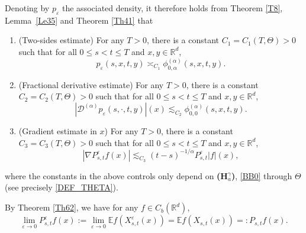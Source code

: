 \documentclass[11pt]{article}
\numberwithin{equation}{section}\providecommand{\asymp}{\mathrel{\sim}}
\theoremstyle{plain}
\theoremstyle{definition}
\let\eps\varepsilon
\newcommand\cD{{\mathcal D}}
\newcommand\mE{\mathbb{E}}
\newcommand\mR{\mathbb{R}}
\newcommand\1{{\mathbf{1}}}
\begin{document}
Denoting by $p_\eps $ the associated density, it therefore holds from Theorem \ref{T8},
Lem\-ma~\ref{Le35} and Theorem \ref{Th41} that
\begin{enumerate}
\item (Two-sides estimate) For any $T>0$, there is a constant $C_1=C_1(T,\Theta)>0$ such that for all $0\leq s<t\leq T$ and $x,y\in\mR^d$,
\begin{equation}\label{TW_EPS}
p_\eps(s,x,t,y)\asymp_{C_1} \phi^{(\alpha)}_{0,\alpha}(s,x,t,y).
\end{equation}
\item (Fractional derivative estimate) For any $T>0$, there is a constant $C_2=C_2(T,\Theta)>0$ such that for all $0\leq s<t\leq T$ and $x,y\in\mR^d$,
\begin{equation}\label{FR_EPS}
|\cD^{(\alpha)}{p_\eps(s,\cdot,t,y)}|(x)\lesssim_{C_2}\phi^{(\alpha)}_{0,0}(s,x,t,y).
\end{equation}
\item (Gradient estimate in $x$) For any $T>0$, there is a constant $C_3=C_3(T,\Theta)>0$ such that for all $0\leq s<t\leq T$ and $x,y\in\mR^d$,
\begin{equation}\label{GR_EPS}
|\nabla P^\eps_{s,t}f(x)|\lesssim_{C_3} (t-s)^{-1/\alpha}P^\eps_{s,t}|f|(x),
\end{equation}
\end{enumerate}
where the constants in the above controls only depend on {\bf (H$^\gamma_a$)}, \eqref{BB0} through $\Theta $
(see precisely \eqref{DEF_THETA}).

By Theorem \ref{Th62}, we have for any $f\in C_b(\mR^d)$,
\begin{equation}\label{LL9}
\lim_{\eps\to 0}P^\eps_{s,t}f(x):=\lim_{\eps\to 0}\mE f(X^\eps_{s,t}(x))=\mE f(X_{s,t}(x))=:P_{s,t}f(x).
\end{equation}
\end{document}
